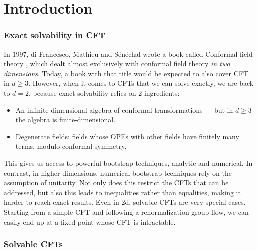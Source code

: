 \documentclass[12pt, a4paper]{article}
\theoremstyle{break}
\begin{document}
\clearpage

\tableofcontents

\hypersetup{linkcolor=blue}

\setcounter{section}{-1}

\pagebreak

\section{Introduction}

\subsubsection*{Exact solvability in CFT}

In 1997, di Francesco, Mathieu and Sénéchal wrote a book called Conformal field theory \cite{fms97}, which dealt almost exclusively with conformal field theory \textit{in two dimensions}. Today, a book with that title would be expected to also cover CFT in $d\geq 3$. However, when it comes to CFTs that we can solve exactly, we are back to $d=2$, because exact solvability relies on 2 ingredients:
\begin{itemize}
 \item An infinite-dimensional algebra of conformal transformations --- but in $d\geq 3$ the algebra is finite-dimensional. 
 \item Degenerate fields: fields whose OPEs with other fields have finitely many terms, modulo conformal symmetry. 
\end{itemize}
This gives us access to powerful bootstrap techniques, analytic and numerical. In contrast, in higher dimensions, numerical bootstrap techniques rely on the assumption of unitarity. Not only does this restrict the CFTs that can be addressed, but also this leads to inequalities rather than equalities, making it harder to reach exact results. 
Even in 2d, solvable CFTs are very special cases. Starting from a simple CFT and following a renormalization group flow, we can easily end up at a fixed point whose CFT is intractable. 

\subsubsection*{Solvable CFTs}
\end{document}
